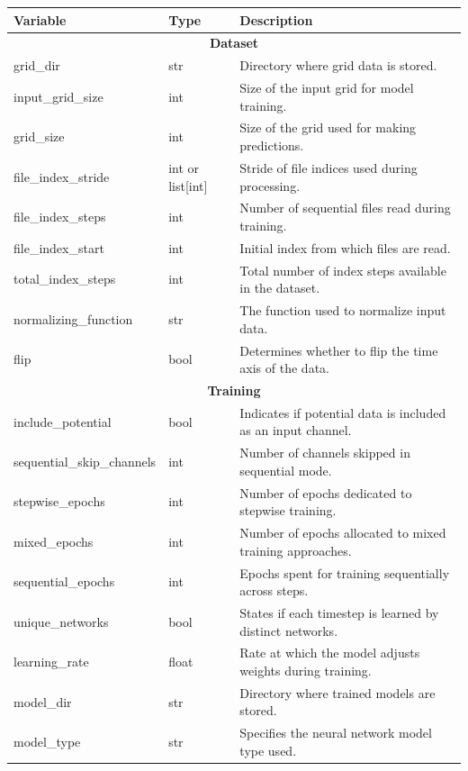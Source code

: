 \documentclass{article}
\begin{document}
\renewcommand{\arraystretch}{1.2}
\begin{table}[h!]
\small
\centering
\begin{tabular}{||l l l||} 
 \hline
 Variable & Type & Description \\ [0.5ex] 
 \hline\hline
 \multicolumn{3}{||c||}{\textbf{Dataset}} \\
 \hline
 grid\_dir & str & Directory where grid data is stored. \\ 
 input\_grid\_size & int & Size of the input grid for model training. \\ 
 grid\_size & int & Size of the grid used for making predictions. \\ 
 file\_index\_stride & int or list[int] & Stride of file indices used during processing. \\ 
 file\_index\_steps & int & Number of sequential files read during training. \\ 
 file\_index\_start & int & Initial index from which files are read. \\ 
 total\_index\_steps & int & Total number of index steps available in the dataset. \\ 
 normalizing\_function & str & The function used to normalize input data. \\ 
 flip & bool & Determines whether to flip the time axis of the data. \\ 
 \hline
 \multicolumn{3}{||c||}{\textbf{Training}} \\
 \hline
 include\_potential & bool & Indicates if potential data is included as an input channel. \\ 
 sequential\_skip\_channels & int & Number of channels skipped in sequential mode. \\ 
 stepwise\_epochs & int & Number of epochs dedicated to stepwise training. \\ 
 mixed\_epochs & int & Number of epochs allocated to mixed training approaches. \\ 
 sequential\_epochs & int & Epochs spent for training sequentially across steps. \\ 
 unique\_networks & bool & States if each timestep is learned by distinct networks. \\ 
 learning\_rate & float  & Rate at which the model adjusts weights during training. \\ 
 model\_dir & str & Directory where trained models are stored. \\ 
 model\_type & str & Specifies the neural network model type used. \\ 

\end{tabular}
\end{table}
\end{document}
